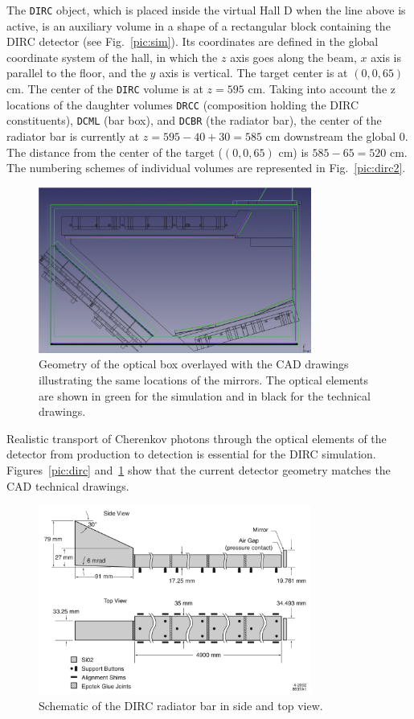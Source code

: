 The \texttt{DIRC} object, which is placed inside the virtual Hall D when the line above is active, is an auxiliary volume in a shape of a rectangular block containing the DIRC detector (see Fig.~\ref{pic:sim}). Its coordinates are defined in the global coordinate system of the hall, in which the $z$ axis goes along the beam, $x$ axis is parallel to the floor, and the $y$ axis is vertical. The target center is at $(0, 0, 65)$ cm. The center of the \texttt{DIRC} volume is at $z = 595$ cm.
Taking into account the z locations of the daughter volumes \texttt{DRCC} (composition holding the DIRC constituents), \texttt{DCML} (bar box), and \texttt{DCBR} (the radiator bar), the center of the radiator bar is currently at $z = 595 - 40 + 30 =585$ cm downstream the global 0. The distance from the center of the target ($(0, 0, 65)$ cm) is $585 - 65 = 520$ cm. The numbering schemes of individual volumes are represented in Fig.~\ref{pic:dirc2}.

\begin{figure}[!h]
\centering
\includegraphics[width=0.8\textwidth]{pics/obgeom.png}
\caption{\label{pic:obg}
Geometry of the optical box overlayed with the CAD drawings illustrating the same locations of the mirrors. The optical elements are shown in green for the simulation and in black for the technical drawings.
}
\end{figure}

Realistic transport of Cherenkov photons through the optical elements of the detector from production to detection is essential for the DIRC simulation. Figures~\ref{pic:dirc} and~\ref{pic:obg} show that the current detector geometry matches the CAD technical drawings.

\begin{figure}[!htb]
\centering
\includegraphics[width=0.8\textwidth]{pics/bars.png}
\caption{\label{pic:bar}
Schematic of the DIRC radiator bar in side and top view.
}
\end{figure} 


